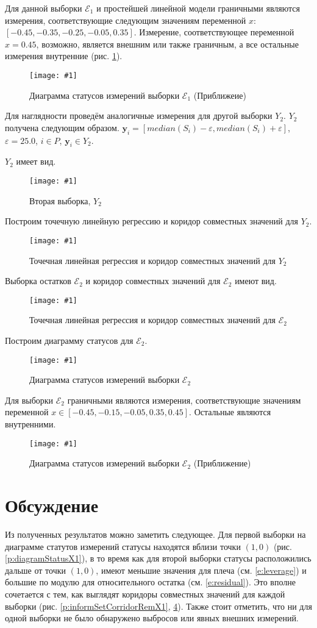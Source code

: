 \documentclass[a4paper,12pt]{article}
\newcommand{\plot}[3]{
    \begin{figure}[H]
        \begin{center}
            \texttt{[image: \#1]}
            \caption{#2}
            \label{#3}
        \end{center}
    \end{figure}
}
\begin{document}
    Для данной выборки $ \mathcal{E}_1 $ и простейшей линейной модели граничными являются
    измерения, соответствующие следующим значениям переменной $ x $: $ [-0.45, -0.35, -0.25, -0.05, 0.35] $.
    Измерение, соответствующее переменной $ x = 0.45 $, возможно, является внешним или также граничным,
    а все остальные измерения внутренние (рис. \ref{p:diagramStatusZoomX1}).
    \plot{DiagramStatusZoomX1}{Диаграмма статусов измерений выборки $ \mathcal{E}_1 $ (Приближеие)}{p:diagramStatusZoomX1}

    Для наглядности проведём аналогичные измерения для другой выборки $ Y_2 $.
    $ Y_2 $ получена следующим образом. $ \textbf{y}_i = [median(S_i) - \varepsilon, median(S_i) + \varepsilon] $,
    $ \varepsilon = 25.0 $, $ i \in P $, $ \textbf{y}_i \in Y_2 $. 

    $ Y_2 $ имеет вид.
    \plot{SampleX2}{Вторая выборка, $ Y_2 $}{p:sampleX2}

    Построим точечную линейную регрессию и коридор совместных значений для $ Y_2 $.
    \plot{InformSetCorridorX2}{Точечная линейная регрессия и коридор совместных значений для $ Y_2 $}{p:informSetCorridorX2}

    Выборка остатков $ \mathcal{E}_2 $ и коридор совместных значений для $ \mathcal{E}_2 $ имеют вид.
    \plot{InformSetCorridorRemX2}{Точечная линейная регрессия и коридор совместных значений для $ \mathcal{E}_2 $}{p:informSetCorridorRemX2}

    Построим диаграмму статусов для $ \mathcal{E}_2 $.
    \plot{DiagramStatusX2}{Диаграмма статусов измерений выборки $ \mathcal{E}_2 $}{p:diagramStatusX2}

    Для выборки $ \mathcal{E}_2 $ граничными являются измерения, соответствующие значениям
    переменной $ x \in [-0.45, -0.15, -0.05, 0.35, 0.45] $.
    Остальные являются внутренними.
    \plot{DiagramStatusZoomX2}{Диаграмма статусов измерений выборки $ \mathcal{E}_2 $ (Приближение)}{p:diagramStatusZoomX2}

    \section{Обсуждение}
    \quad Из полученных результатов можно заметить следующее.
    Для первой выборки на диаграмме статутов измерений статусы находятся вблизи точки $ (1, 0) $ (рис. \ref{p:diagramStatusX1}),
    в то время как для второй выборки статусы расположились дальше от точки $ (1, 0) $,
    имеют меньшие значения для плеча (см. \ref{e:leverage}) и большие по модулю для относительного остатка (см. \ref{e:residual}).
    Это вполне сочетается с тем, как выглядят коридоры совместных значений для каждой выборки
    (рис. \ref{p:informSetCorridorRemX1}, \ref{p:informSetCorridorRemX2}).
    Также стоит отметить, что ни для одной выборки не было обнаружено выбросов или явных внешних измерений.
\end{document}
